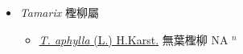 
  \begin{itemize}
 \item[] \textit{Tamarix} 檉柳屬
                    
  \begin{itemize}
        \item[] \href{http://www.theplantlist.org/tpl1.1/search?q=Tamarix+aphylla}{\textit{T. aphylla} (L.) H.Karst.}   無葉檉柳 NA $^n$
  \end{itemize}
  \end{itemize}
